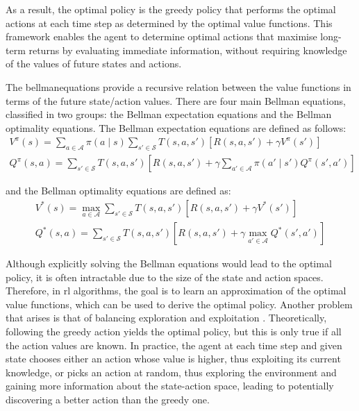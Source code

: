 As a result, the optimal policy is the greedy policy that performs the optimal actions at each time step as determined by the optimal value functions. This framework enables the agent to determine optimal actions that maximise long-term returns by evaluating immediate information, without requiring knowledge of the values of future states and actions.

The \Gls{bellmanequations} \cite{Bellman1957book} provide a recursive relation between the value functions in terms of the future state/action values. There are four main Bellman equations, classified in two groups: the Bellman expectation equations and the Bellman optimality equations. The Bellman expectation equations are defined as follows:
\begin{eqnarray}
    V^\pi(s) = \sum_{a \in \mathcal{A}} \pi\left(a \mid s\right) \sum_{s'\in \mathcal{S}} T\left(s, a, s'\right) \left[R\left(s,a,s'\right) + \gamma V^\pi(s')\right] \\ 
    Q^\pi(s, a) = \sum_{s'\in \mathcal{S}} T\left(s, a, s'\right) \left[R\left(s,a,s'\right) + \gamma \sum_{a' \in \mathcal{A}} \pi\left(a' \mid s'\right) Q^\pi(s', a')\right]
\end{eqnarray}

and the Bellman optimality equations are defined as:
\begin{eqnarray}
    V^*(s) = \max_{a \in \mathcal{A}} \sum_{s'\in \mathcal{S}} T\left(s, a, s'\right) \left[R\left(s,a,s'\right) + \gamma V^*(s')\right] \\
    Q^*(s, a) = \sum_{s'\in \mathcal{S}} T\left(s, a, s'\right) \left[R\left(s,a,s'\right) + \gamma \max_{a' \in \mathcal{A}} Q^*(s', a')\right]
\end{eqnarray}

Although explicitly solving the Bellman equations would lead to the optimal policy, it is often intractable due to the size of the state and action spaces. Therefore, in \acrshort{rl} algorithms, the goal is to learn an approximation of the optimal value functions, which can be used to derive the optimal policy. Another problem that arises is that of balancing \gls{exploration} and \gls{exploitation} \cite{Thrun1992}. Theoretically, following the greedy action yields the optimal policy, but this is only true if all the action values are known. In practice, the agent at each time step and given state chooses either an action whose value is higher, thus exploiting its current knowledge, or picks an action at random, thus exploring the environment and gaining more information about the state-action space, leading to potentially discovering a better action than the greedy one.

